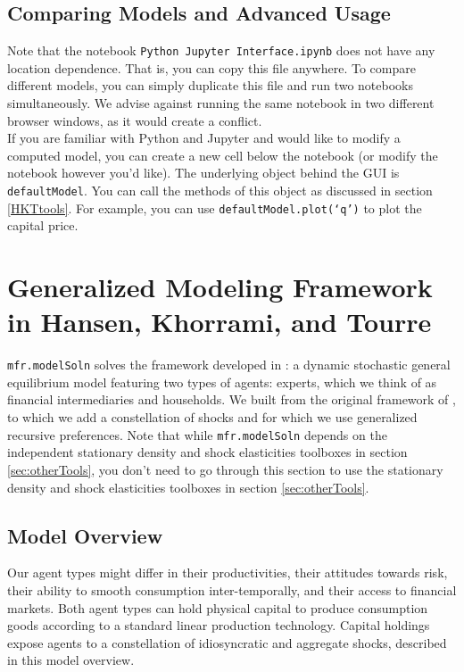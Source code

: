 \documentclass[12pt]{article}
\newcommand{\modelSolnProg}{mfr.modelSoln\xspace}
\begin{document}
\subsection{Comparing Models and Advanced Usage}
Note that the notebook \texttt{Python Jupyter Interface.ipynb} does not have any location dependence. That is, you can copy this file anywhere. To compare different models, you can simply duplicate this file and run two notebooks simultaneously. We advise against running the same notebook in two different browser windows, as it would create a conflict.\\

If you are familiar with Python and Jupyter and would like to modify a computed model, you can create a new cell below the notebook (or modify the notebook however you'd like). The underlying object behind the GUI is \texttt{defaultModel}. You can call the methods of this object as discussed in section \ref{HKTtools}. For example, you can use \texttt{defaultModel.plot(`q')} to plot the capital price.

\newpage

\section{Generalized Modeling Framework in Hansen, Khorrami, and Tourre} \label{modelSolnIntro}

\texttt{\modelSolnProg} solves the framework developed in \citet{HKT}: a dynamic stochastic general equilibrium model featuring two types of agents: experts, which we think of as financial intermediaries and households. We built from the original framework of \citet{BS2014}, to which we add a constellation of shocks and for which we use generalized recursive preferences. Note that while \texttt{\modelSolnProg} depends on the independent stationary density and shock elasticities toolboxes in section \ref{sec:otherTools}, you don't need to go through this section to use the stationary density and shock elasticities toolboxes in section \ref{sec:otherTools}.\\

\subsection{Model Overview}
Our agent types might differ in their productivities, their attitudes towards risk, their ability to smooth consumption inter-temporally, and their access to financial markets. Both agent types can hold physical capital to produce consumption goods according to a standard linear production technology. Capital holdings expose agents to a constellation of idiosyncratic and aggregate shocks, described in this model overview.
\end{document}
